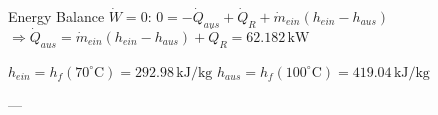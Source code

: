 Energy Balance \( \dot{W} = 0 \):  
\( 0 = -\dot{Q}_{aus} + \dot{Q}_R + \dot{m}_{ein} (h_{ein} - h_{aus}) \)  
\( \Rightarrow \dot{Q}_{aus} = \dot{m}_{ein} (h_{ein} - h_{aus}) + \dot{Q}_R = 62.182 \, \text{kW} \)  

\( h_{ein} = h_f(70^\circ \text{C}) = 292.98 \, \text{kJ/kg} \)  
\( h_{aus} = h_f(100^\circ \text{C}) = 419.04 \, \text{kJ/kg} \)  

---